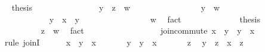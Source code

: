 \begin{isabellebody}
\ \isamarkupfalse%
\ {\isacharquery}thesis\ \isacommand{{\isachardot}}\isamarkupfalse%
\isanewline
\ \ \ \ \ \ \isamarkupfalse%
\isanewline
\ \ \ \ \ \ \isamarkupfalse%
\ {\isachardoublequoteopen}y\ {\isasymsqunion}\ z\ {\isasymsqsubseteq}\ w{\isachardoublequoteclose}\isanewline
\ \ \ \ \ \ \isamarkupfalse%
\isanewline
\ \ \ \ \ \ \ \ \isamarkupfalse%
\ {\isachardoublequoteopen}y\ {\isasymsqsubseteq}\ w{\isachardoublequoteclose}\isanewline
\ \ \ \ \ \ \ \ \isamarkupfalse%
\ {\isacharminus}\isanewline
\ \ \ \ \ \ \ \ \ \ \isamarkupfalse%
\ {\isachardoublequoteopen}y\ {\isasymsqsubseteq}\ x\ {\isasymsqunion}\ y{\isachardoublequoteclose}\ \isacommand{{\isachardot}{\isachardot}}\isamarkupfalse%
\isanewline
\ \ \ \ \ \ \ \ \ \ \isamarkupfalse%
\ \isamarkupfalse%
\ {\isachardoublequoteopen}{\isachardot}{\isachardot}{\isachardot}\ {\isasymsqsubseteq}\ w{\isachardoublequoteclose}\ \isamarkupfalse%
\ fact\isanewline
\ \ \ \ \ \ \ \ \ \ \isamarkupfalse%
\ \isamarkupfalse%
\ {\isacharquery}thesis\ \isacommand{{\isachardot}}\isamarkupfalse%
\isanewline
\ \ \ \ \ \ \ \ \isamarkupfalse%
\isanewline
\ \ \ \ \ \ \ \ \isamarkupfalse%
\ {\isachardoublequoteopen}z\ {\isasymsqsubseteq}\ w{\isachardoublequoteclose}\ \isamarkupfalse%
\ fact\isanewline
\ \ \ \ \ \ \isamarkupfalse%
\isanewline
\ \ \ \ \isamarkupfalse%
\isanewline
\ \ \isamarkupfalse%
\isanewline
\isanewline
\ \ \isamarkupfalse%
\ join{\isacharunderscore}commute{\isacharcolon}\ {\isachardoublequoteopen}x\ {\isasymsqunion}\ y\ {\isacharequal}\ y\ {\isasymsqunion}\ x{\isachardoublequoteclose}\isanewline
\ \ \isamarkupfalse%
\ {\isacharparenleft}rule\ joinI{\isacharparenright}\isanewline
\ \ \ \ \isamarkupfalse%
\ {\isachardoublequoteopen}x\ {\isasymsqsubseteq}\ y\ {\isasymsqunion}\ x{\isachardoublequoteclose}\ \isacommand{{\isachardot}{\isachardot}}\isamarkupfalse%
\isanewline
\ \ \ \ \isamarkupfalse%
\ {\isachardoublequoteopen}y\ {\isasymsqsubseteq}\ y\ {\isasymsqunion}\ x{\isachardoublequoteclose}\ \isacommand{{\isachardot}{\isachardot}}\isamarkupfalse%
\isanewline
\ \ \ \ \isamarkupfalse%
\ z\ \isamarkupfalse%
\ {\isachardoublequoteopen}y\ {\isasymsqsubseteq}\ z{\isachardoublequoteclose}\ \ {\isachardoublequoteopen}x\ {\isasymsqsubseteq}\ z{\isachardoublequoteclose}\isanewline

\end{isabellebody}
